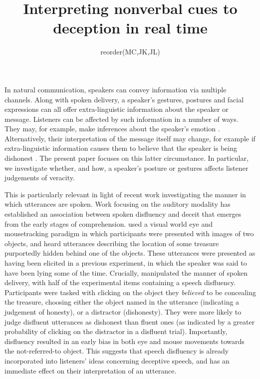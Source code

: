 \documentclass[a4paper,man,natbib]{apa6}
\title{Interpreting nonverbal cues to deception in real time}
\author{reorder(MC,JK,JL)}
\affiliation{Psychology, PPLS, University of Edinburgh}
\begin{document}
\maketitle
\linenumbers
\noindent
In natural communication, speakers can convey information via multiple channels.
Along with spoken delivery, a speaker's gestures, postures and facial expressions can all offer extra-linguistic information about the speaker or message.
Listeners can be affected by such information in a number of ways.
They may, for example, make inferences about the speaker's emotion \citep{Busso2004, Gregersen2005}.
Alternatively, their interpretation of the message itself may change, for example if extra-linguistic information causes them to believe that the speaker is being dishonest \citep{Zuckerman1981}.
The present paper focuses on this latter circumstance.
In particular, we investigate whether, and how, a speaker's posture or gestures affects listener judgements of veracity.

This is particularly relevant in light of recent work investigating the manner in which utterances are spoken.  Work focusing on the auditory modality has established an association between spoken disfluency and deceit that emerges from the early stages of comprehension.
\citet{Loy2017} used a visual world eye and mousetracking paradigm in which participants were presented with images of two objects, and heard utterances describing the location of some treasure purportedly hidden behind one of the objects.
These utterances were presented as having been elicited in a previous experiment, in which the speaker was said to have been lying some of the time.
Crucially, \citet{Loy2017} manipulated the manner of spoken delivery, with half of the experimental items containing a speech disfluency.
Participants were tasked with clicking on the object they \textit{believed} to be concealing the treasure, choosing either the object named in the utterance (indicating a judgement of honesty), or a distractor (dishonesty).
They were more likely to judge disfluent utterances as dishonest than fluent ones (as indicated by a greater probability of clicking on the distractor in a disfluent trial). 
Importantly, disfluency resulted in an early bias in both eye and mouse movements towards the not-referred-to object.
This suggests that speech disfluency is already incorporated into listeners' ideas concerning deceptive speech, and has an immediate effect on their interpretation of an utterance. 
\end{document}
